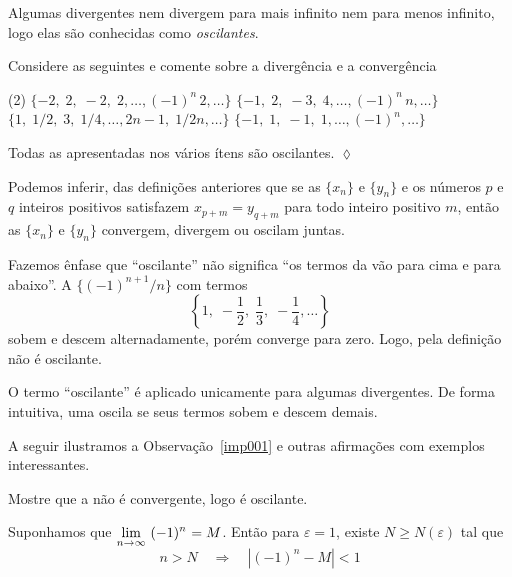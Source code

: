 Algumas \seqs divergentes nem divergem para mais infinito nem para menos infinito, logo elas s\~{a}o conhecidas 
como \emph{oscilantes}.
\begin{exer}
Considere as seguintes \seqs e comente sobre a diverg\^{e}ncia e a converg\^{e}ncia
\begin{tasks}[label=(\alph*),item-indent=3em,label-width=4ex,ref=(\alph*)](2)
\task \(\{ -2,\; 2,\;-2,\;2,\ldots, (-1)^{n}\,2,\ldots \}\)
\task \(\{ -1,\; 2,\;-3,\;4, \ldots, (-1)^{n}\,n,\ldots \}\)
\task \(\{ 1,\; 1/2,\;3,\;1/4,\ldots, 2n-1,\;1/2n,\ldots \}\)
\task \(\{ -1,\; 1,\;-1,\;1,\ldots, (-1)^n,\ldots \}\)
\end{tasks}
\end{exer}

\solo Todas as \seqs apresentadas nos v\'{a}rios ítens s\~{a}o  oscilantes. \hfill \(\lozenge\)

\begin{obs}
Podemos inferir, das defini\c{c}\~{o}es anteriores que se as \seqs $\{x_n\}$ e $\{y_n\}$ e os n\'{u}meros $p$ e $q$ inteiros positivos satisfazem $x_{p+m}=y_{q+m}$ para todo inteiro positivo $m$, ent\~{a}o as \seqs $\{x_n\}$ e $\{y_n\}$ convergem, divergem ou oscilam juntas.
\end{obs}


Fazemos \^{e}nfase que ``oscilante'' n\~{a}o significa ``os termos da \seq v\~{a}o para cima e para abaixo''. A \seq $\{(-1)^{n+1}/n\}$ com termos
\begin{equation*}
    \left\{ 1,\; -\frac{1}{2},\; \frac{1}{3},\; -\frac{1}{4},\ldots\right\}
\end{equation*}
sobem e descem alternadamente, por\'{e}m converge para zero. Logo, pela defini\c{c}\~{a}o n\~{a}o \'{e} oscilante.

O termo ``oscilante'' \'{e} aplicado unicamente para algumas \seqs divergentes. De forma intuitiva, uma \seq oscila se seus termos sobem e descem demais.

A seguir ilustramos a Observa\c{c}\~{a}o~\ref{imp001} e outras afirma\c{c}\~{o}es com exemplos interessantes.

\begin{exer}
Mostre que a \seq {} n\~{a}o \'{e} convergente, logo \'{e} oscilante.
\end{exer}

\solo Suponhamos que $\displaystyle{\lim_{n\to \infty}\,{(-1)^n}_{}}=M$. Ent\~{a}o para $\varepsilon=1$, existe $N\geq N(\varepsilon)$ tal que
\begin{equation*}
n>N \quad \Rightarrow \quad |(-1)^n-M|<1
\end{equation*}

